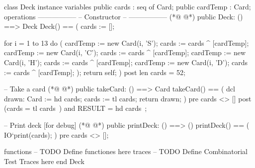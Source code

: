 \begin{vdmpp}[breaklines=true]
class Deck
 instance variables
  public cards : seq of Card;
  public cardTemp : Card;
 operations
  -----------------
  -- Constructor --
  -----------------
(*@
\label{Deck:9}
@*)
  public Deck: () ==> Deck
   Deck() == (
    cards := []; 

    for i = 1 to 13 do
    (
     cardTemp := new Card(i, 'S');
     cards := cards ^ [cardTemp];
     cardTemp := new Card(i, 'C');
     cards := cards ^ [cardTemp];
     cardTemp := new Card(i, 'H');
     cards := cards ^ [cardTemp];
     cardTemp := new Card(i, 'D');
     cards := cards ^ [cardTemp];
    );
    return self;
   )
  post len cards = 52;
  
  
  -- Take a card
(*@
\label{takeCard:30}
@*)
  public takeCard: () ==> Card
   takeCard() == 
   (
    dcl drawn: Card := hd cards;
    cards := tl cards;
    return drawn;
   )
  pre cards <> []
  post (cards = tl cards~) and RESULT = hd cards~;  
  
  -- Print deck [for debug]
(*@
\label{printDeck:41}
@*)
  public printDeck: () ==> ()
  printDeck() == 
  (
   IO`print(cards);
  )
  pre cards <> [];
  
 functions
 -- TODO Define functiones here
 traces
 -- TODO Define Combinatorial Test Traces here
end Deck
\end{vdmpp}
